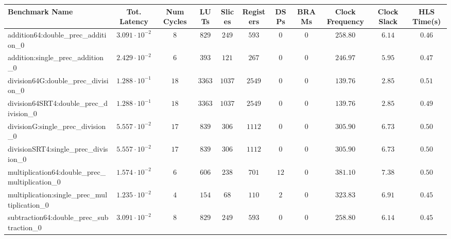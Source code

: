 \begin{tabular}{|l|c|c|c|c|c|c|c|c|c|c|}
\hline
Benchmark Name                                   & Tot. Latency            & Num Cycles & LUTs      & Slices   & Registers & DSPs   & BRAMs & Clock Frequency & Clock Slack & HLS Time(s) \\
\hline
addition64:double\_prec\_addition\_0             & $ 3.091 \cdot 10^{-2} $ & $ 8      $ & $ 829   $ & $ 249  $ & $ 593   $ & $ 0  $ & $ 0 $ & $ 258.80      $ & $ 6.14    $ & $ 0.46    $ \\
addition:single\_prec\_addition\_0               & $ 2.429 \cdot 10^{-2} $ & $ 6      $ & $ 393   $ & $ 121  $ & $ 267   $ & $ 0  $ & $ 0 $ & $ 246.97      $ & $ 5.95    $ & $ 0.47    $ \\
division64G:double\_prec\_division\_0            & $ 1.288 \cdot 10^{-1} $ & $ 18     $ & $ 3363  $ & $ 1037 $ & $ 2549  $ & $ 0  $ & $ 0 $ & $ 139.76      $ & $ 2.85    $ & $ 0.51    $ \\
division64SRT4:double\_prec\_division\_0         & $ 1.288 \cdot 10^{-1} $ & $ 18     $ & $ 3363  $ & $ 1037 $ & $ 2549  $ & $ 0  $ & $ 0 $ & $ 139.76      $ & $ 2.85    $ & $ 0.49    $ \\
divisionG:single\_prec\_division\_0              & $ 5.557 \cdot 10^{-2} $ & $ 17     $ & $ 839   $ & $ 306  $ & $ 1112  $ & $ 0  $ & $ 0 $ & $ 305.90      $ & $ 6.73    $ & $ 0.50    $ \\
divisionSRT4:single\_prec\_division\_0           & $ 5.557 \cdot 10^{-2} $ & $ 17     $ & $ 839   $ & $ 306  $ & $ 1112  $ & $ 0  $ & $ 0 $ & $ 305.90      $ & $ 6.73    $ & $ 0.50    $ \\
multiplication64:double\_prec\_multiplication\_0 & $ 1.574 \cdot 10^{-2} $ & $ 6      $ & $ 606   $ & $ 238  $ & $ 701   $ & $ 12 $ & $ 0 $ & $ 381.10      $ & $ 7.38    $ & $ 0.50    $ \\
multiplication:single\_prec\_multiplication\_0   & $ 1.235 \cdot 10^{-2} $ & $ 4      $ & $ 154   $ & $ 68   $ & $ 110   $ & $ 2  $ & $ 0 $ & $ 323.83      $ & $ 6.91    $ & $ 0.45    $ \\
subtraction64:double\_prec\_subtraction\_0       & $ 3.091 \cdot 10^{-2} $ & $ 8      $ & $ 829   $ & $ 249  $ & $ 593   $ & $ 0  $ & $ 0 $ & $ 258.80      $ & $ 6.14    $ & $ 0.45    $ \\

\end{tabular}
